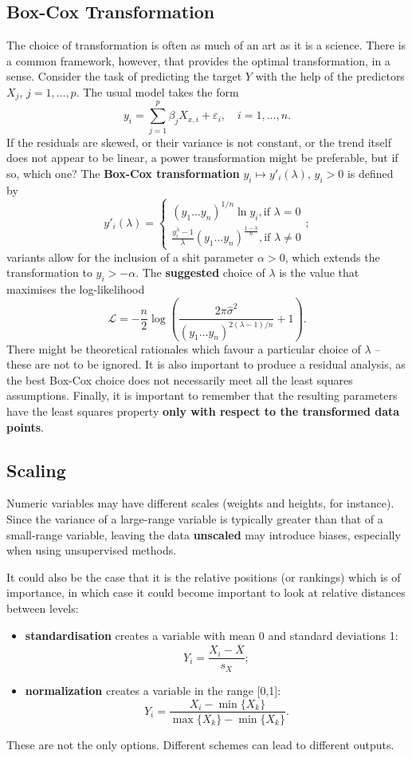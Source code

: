 \subsection{Box-Cox Transformation} The choice of transformation is often as much of an art as it is a science. There is a common  framework, however, that provides the  optimal transformation, in a sense. Consider the task of predicting the target $Y$ with the help of the predictors $X_j$, $j=1,\ldots, p$. The usual model takes the form $$y_i=\sum_{j=1}^p\beta_jX_{x,i}+\varepsilon_i,\quad i=1,\ldots, n.$$ If the residuals are skewed, or their variance is not constant, or the trend itself does not appear to be linear, a power transformation might be preferable, but if so,  which one? \newl The \textbf{Box-Cox transformation} $y_i\mapsto y'_i(\lambda)$, $y_i>0$ is defined by  $$y'_i(\lambda)=\begin{cases}(y_1 \ldots   y_n)^{1/n}\ln y_i, \text{if }\lambda=0 \\ 
\frac{y_i^{\lambda}-1}{\lambda}(y_1 \ldots   y_n)^{\frac{1-\lambda}{n}}, \text{if }\lambda\neq 0
\end{cases};$$
variants allow for the inclusion of a shit parameter $\alpha>0$, which extends the transformation to $y_i>-\alpha$. The \textbf{suggested} choice of $\lambda$ is the value that maximises the log-likelihood $$\mathcal{L}=-\frac{n}{2}\log\left(\frac{2\pi\hat{\sigma}^2}{(y_1 \ldots   y_n)^{2(\lambda-1)/n}}+1\right).$$
There might be theoretical rationales which favour a particular choice of $\lambda$ -- these are not to be ignored. It is also important to produce a residual analysis, as the best Box-Cox choice does not necessarily meet all the least squares assumptions. \newl Finally, it is important to remember that the resulting parameters have the least squares property \textbf{only with respect to the transformed data points}. 
\subsection{Scaling} Numeric variables may have different scales (weights and heights, for instance). Since the variance of a large-range variable is typically greater than that of a small-range variable, leaving the data \textbf{unscaled} may introduce biases, especially when using unsupervised methods.\par  It could also be the case that it is the relative positions (or rankings) which is of importance, in which case it could become important to look at relative distances between levels: 
\begin{itemize}[noitemsep]
\item \textbf{standardisation} creates a variable with mean 0 and standard deviations 1: $$Y_i=\frac{X_i-\overline{X}}{s_X};$$
\item \textbf{normalization} creates a variable in the range [0,1]: $$Y_i=\frac{X_i-\min\{X_k\}}{\max \{X_k\}- \min \{X_k\}}.$$
\end{itemize}
These are not the only options. Different schemes can lead to different outputs. 
